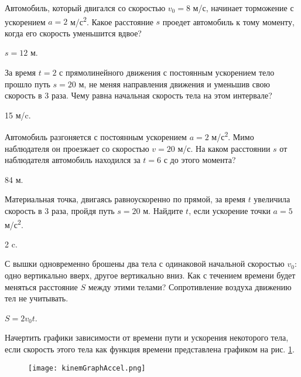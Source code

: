 \begin{ex} %
Автомобиль, который двигался со скоростью $v_0 = 8$ м/с, начинает торможение с ускорением $a = 2$ м/с\textsuperscript{2}. Какое расстояние $s$ проедет автомобиль к тому моменту, когда его скорость уменьшится вдвое?
\begin{ans}
$s = 12$ м.
\end{ans}
\end{ex}

\begin{ex} %
За время $t = 2$ с прямолинейного движения с постоянным ускорением тело прошло путь $s = 20$ м, не меняя направления движения и уменьшив свою скорость в 3 раза. Чему равна начальная скорость тела на этом интервале?
\begin{ans}
15 м/c.
\end{ans}
\end{ex}

\begin{ex} %
Автомобиль разгоняется с постоянным ускорением $a = 2$ м/с\textsuperscript{2}. Мимо наблюдателя он проезжает со скоростью $v = 20$ м/с. На каком расстоянии $s$ от наблюдателя автомобиль находился за $t = 6$ с до этого момента?
\begin{ans}
84 м.
\end{ans}
\end{ex}

\begin{ex} %
Материальная точка, двигаясь равноускоренно по прямой, за время $t$ увеличила скорость в 3 раза, пройдя путь $s = 20$ м. Найдите $t$, если ускорение точки $a = 5$ м/с\textsuperscript{2}.
\begin{ans}
2 c.
\end{ans}
\end{ex}

\begin{ex} %
С вышки одновременно брошены два тела с одинаковой начальной скоростью $v_0$: одно вертикально вверх, другое вертикально вниз. Как с течением времени будет меняться расстояние $S$ между этими телами? Сопротивление воздуха движению тел не учитывать.
\begin{ans}
$S = 2 v_0 t$.
\end{ans}
\end{ex}

\begin{ex} %
Начертить графики зависимости от времени пути и ускорения некоторого тела, если скорость этого тела как функция времени представлена графиком на рис. \ref{kinemGraphAccel}.

\begin{figure}
\centering
\texttt{[image: kinemGraphAccel.png]}
\caption{}
\label{kinemGraphAccel}
\end{figure}
\end{ex}

